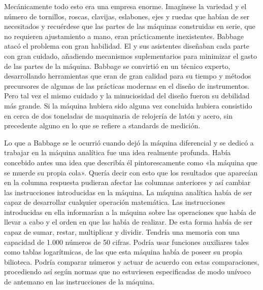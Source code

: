 \documentclass[a4paper, 12pt]{article}
\begin{document}
Mecánicamente todo esto era una empresa enorme. Imagínese la variedad y el número de tornillos, roscas, clavijas, eslabones, ejes y ruedas que habían de ser necesitados y recuérdese que las partes de las máquinas construidas en serie, que no requieren ajustamiento a mano, eran prácticamente  inexistentes. Babbage atacó el problema con gran habilidad. El y sus asistentes diseñaban cada parte con gran cuidado, añadiendo mecanismos suplementarios para minimizar el gasto de las partes de la máquina. Babbage se convirtió en un técnico experto, desarrollando herramientas que eran de gran calidad para su tiempo y métodos precursores de algunas de las prácticas modernas en el diseño de instrumentos. Pero tal vez el mismo cuidado y la minuciosidad del diseño fueron su debilidad más grande. Si la máquina hubiera sido alguna vez concluida hubiera consistido en cerca de dos toneladas de maquinaria de relojería de latón y acero, sin precedente alguno en lo que se refiere a standards de medición.

Lo que a Babbage se le ocurrió cuando dejó la máquina diferencial y se dedicó a trabajar en la máquina analítica fue una idea realmente profunda. Había concebido antes una idea que describía él pintorescamente como «la máquina que se muerde su propia cola». Quería decir con esto que los resultados que aparecían en la columna respuesta pudieran afectar las columnas anteriores y así cambiar las instrucciones introducidas en la máquina. La máquina analítica había de ser capaz de desarrollar cualquier operación matemática. Las instrucciones introducidas en ella informarían a la máquina sobre las operaciones que había de llevar a cabo y el orden en que las había de realizar. De esta forma había de ser capaz de sumar, restar, multiplicar y dividir. Tendría una memoria con una capacidad de 1.000 números de 50 cifras. Podría usar funciones auxiliares tales como tablas logarítmicas, de las que esta máquina había de poseer su propia bilioteca. Podría comparar números y actuar de acuerdo con estas comparaciones, procediendo así según normas que no estuviesen especificadas de modo unívoco de antemano en las instrucciones de la máquina.
\end{document}
